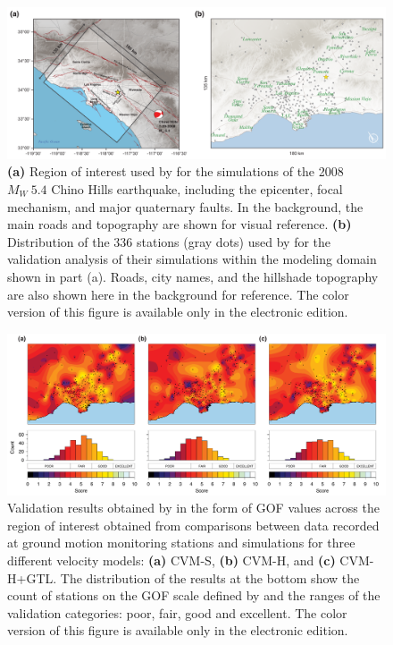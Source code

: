 \begin{figure}[ht!]
    \centering
    \includegraphics[width=\textwidth]{figures/pdf/figure-01}
    \caption{\textbf{(a)} Region of interest used by \citet{Taborda_2014_BSSA} for the simulations of the 2008 $M_W ~ 5.4$ Chino Hills earthquake, including the epicenter, focal mechanism, and major quaternary faults. In the background, the main roads and topography are shown for visual reference. \textbf{(b)} Distribution of the 336 stations (gray dots) used by \citet{Taborda_2014_BSSA} for the validation analysis of their simulations within the modeling domain shown in part (a). Roads, city names, and the hillshade topography are also shown here in the background for reference. The color version of this figure is available only in the electronic edition.}
    \label{fig:chino-hills}
\end{figure}

\begin{figure}[t]
    \centering
    \includegraphics[width=\textwidth]{figures/pdf/figure-02}
    \caption{Validation results obtained by \citet{Taborda_2014_BSSA} in the form of GOF values across the region of interest obtained from comparisons between data recorded at ground motion monitoring stations and simulations for three different velocity models: \textbf{(a)} CVM-S, \textbf{(b)} CVM-H, and \textbf{(c)} CVM-H+GTL. The distribution of the results at the bottom show the count of stations on the GOF scale defined by \citet{Anderson_2004_Proc} and the ranges of the validation categories: poor, fair, good and excellent. The color version of this figure is available only in the electronic edition.}
    \label{fig:ref-gof-maps}
\end{figure}

